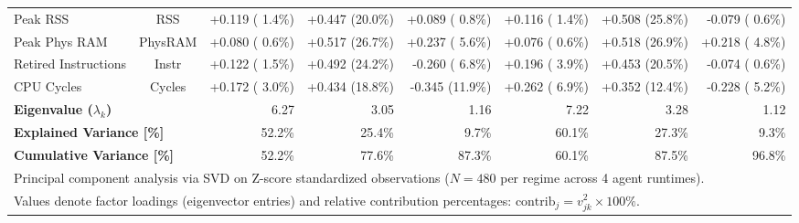 \begin{table}[t]
\begin{tabular}{l c r r r r r r}
Peak RSS & RSS & +0.119 ( 1.4\%) & +0.447 (20.0\%) & +0.089 ( 0.8\%) & +0.116 ( 1.4\%) & +0.508 (25.8\%) & -0.079 ( 0.6\%) \\
Peak Phys RAM & PhysRAM & +0.080 ( 0.6\%) & +0.517 (26.7\%) & +0.237 ( 5.6\%) & +0.076 ( 0.6\%) & +0.518 (26.9\%) & +0.218 ( 4.8\%) \\
Retired Instructions & Instr & +0.122 ( 1.5\%) & +0.492 (24.2\%) & -0.260 ( 6.8\%) & +0.196 ( 3.9\%) & +0.453 (20.5\%) & -0.074 ( 0.6\%) \\
CPU Cycles & Cycles & +0.172 ( 3.0\%) & +0.434 (18.8\%) & -0.345 (11.9\%) & +0.262 ( 6.9\%) & +0.352 (12.4\%) & -0.228 ( 5.2\%) \\
\hline
\multicolumn{2}{l}{\textbf{Eigenvalue ($\lambda_k$)}} & 6.27 & 3.05 & 1.16 & 7.22 & 3.28 & 1.12 \\
\multicolumn{2}{l}{\textbf{Explained Variance [\%]}} & 52.2\% & 25.4\% & 9.7\% & 60.1\% & 27.3\% & 9.3\% \\
\multicolumn{2}{l}{\textbf{Cumulative Variance [\%]}} & 52.2\% & 77.6\% & 87.3\% & 60.1\% & 87.5\% & 96.8\% \\
\hline
\multicolumn{8}{l}{\footnotesize Principal component analysis via SVD on Z-score standardized observations ($N=480$ per regime across 4 agent runtimes).} \\
\multicolumn{8}{l}{\footnotesize Values denote factor loadings (eigenvector entries) and relative contribution percentages: $\text{contrib}_j = v_{jk}^2 \times 100\%$.} \\
\hline
\end{tabular}
\end{table}
